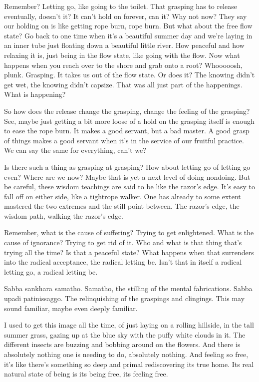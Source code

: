 \documentclass[12pt,openany]{book}
\begin{document}
Remember? Letting go, like going to the toilet. That grasping has to release eventually, doesn’t it? It can’t hold on forever, can it? Why not now? They say our holding on is like getting rope burn, rope burn. But what about the free flow state? Go back to one time when it's a beautiful summer day and we’re laying in an inner tube just floating down a beautiful little river. How peaceful and how relaxing it is, just being  in the flow state, like going with the flow. Now what happens when you reach over to the shore and grab onto a root? Whooooosh, plunk. Grasping. It takes us out of the flow state. Or does it? The knowing didn't get wet, the knowing didn’t capsize. That was all just part of the happenings. What is happening?

So how does the release change the grasping, change the feeling of the grasping? See, maybe just getting a bit more loose of a hold on the grasping itself is enough to ease the rope burn. It makes a good servant, but a bad master. A good grasp of things makes a good servant when it's in the service of our fruitful practice. We can say the same for everything, can't we?

Is there such a thing as grasping at grasping? How about letting go of letting go even? Where are we now? Maybe that is yet a next level of doing nondoing. But be careful, these wisdom teachings are said to be like the razor's edge. It's easy to fall off on either side, like a tightrope walker. One has already to some extent mastered the two extremes and the still point between. The razor's edge, the wisdom path, walking the razor's edge. 

Remember, what is the cause of suffering? Trying to get enlightened. What is the cause of ignorance? Trying to get rid of it. Who and what is that thing that's trying all the time? Is that a peaceful state? What happens when that surrenders into the radical acceptance, the radical letting be. Isn't that in itself a radical letting go, a radical letting be.

Sabba sankhara samatho. Samatho, the stilling of the mental fabrications. Sabba upadi patinissaggo. The relinquishing of the graspings and clingings. This may sound familiar, maybe even deeply familiar.

I used to get this image all the time, of just laying on a rolling hillside, in the tall summer grass, gazing up at the blue sky with the puffy white clouds in it. The different insects are buzzing and bobbing around on the flowers. And there is absolutely nothing one is needing to do, absolutely nothing. And feeling so free, it's like there's something so deep and primal rediscovering its true home. Its real natural state of being is its being free, its feeling free.
\end{document}

